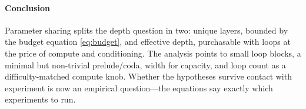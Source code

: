 \paragraph{Conclusion}

Parameter sharing splits the depth question in two: unique
layers, bounded by the budget equation \eqref{eq:budget}, and
effective depth, purchasable with loops at the price of compute
and conditioning. The analysis points to small loop blocks, a
minimal but non-trivial prelude/coda, width for capacity, and
loop count as a difficulty-matched compute knob. Whether the
hypotheses survive contact with experiment is now an empirical
question---the equations say exactly which experiments to run.

